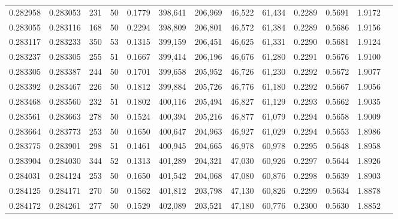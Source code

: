 \begin{tabular}{rrrrrrrrrrrrr}
0.282958 & 0.283053 &   231 &  50 &                                     0.1779 & 398,641 & 206,969 &  46,522 &  61,434 & 0.2289 & 0.5691 & 1.9172 \\
0.283055 & 0.283116 &   168 &  50 &                                     0.2294 & 398,809 & 206,801 &  46,572 &  61,384 & 0.2289 & 0.5686 & 1.9156 \\
0.283117 & 0.283233 &   350 &  53 &                                     0.1315 & 399,159 & 206,451 &  46,625 &  61,331 & 0.2290 & 0.5681 & 1.9124 \\
0.283237 & 0.283305 &   255 &  51 &                                     0.1667 & 399,414 & 206,196 &  46,676 &  61,280 & 0.2291 & 0.5676 & 1.9100 \\
0.283305 & 0.283387 &   244 &  50 &                                     0.1701 & 399,658 & 205,952 &  46,726 &  61,230 & 0.2292 & 0.5672 & 1.9077 \\
0.283392 & 0.283467 &   226 &  50 &                                     0.1812 & 399,884 & 205,726 &  46,776 &  61,180 & 0.2292 & 0.5667 & 1.9056 \\
0.283468 & 0.283560 &   232 &  51 &                                     0.1802 & 400,116 & 205,494 &  46,827 &  61,129 & 0.2293 & 0.5662 & 1.9035 \\
0.283561 & 0.283663 &   278 &  50 &                                     0.1524 & 400,394 & 205,216 &  46,877 &  61,079 & 0.2294 & 0.5658 & 1.9009 \\
0.283664 & 0.283773 &   253 &  50 &                                     0.1650 & 400,647 & 204,963 &  46,927 &  61,029 & 0.2294 & 0.5653 & 1.8986 \\
0.283775 & 0.283901 &   298 &  51 &                                     0.1461 & 400,945 & 204,665 &  46,978 &  60,978 & 0.2295 & 0.5648 & 1.8958 \\
0.283904 & 0.284030 &   344 &  52 &                                     0.1313 & 401,289 & 204,321 &  47,030 &  60,926 & 0.2297 & 0.5644 & 1.8926 \\
0.284031 & 0.284124 &   253 &  50 &                                     0.1650 & 401,542 & 204,068 &  47,080 &  60,876 & 0.2298 & 0.5639 & 1.8903 \\
0.284125 & 0.284171 &   270 &  50 &                                     0.1562 & 401,812 & 203,798 &  47,130 &  60,826 & 0.2299 & 0.5634 & 1.8878 \\
0.284172 & 0.284261 &   277 &  50 &                                     0.1529 & 402,089 & 203,521 &  47,180 &  60,776 & 0.2300 & 0.5630 & 1.8852 \\

\end{tabular}
